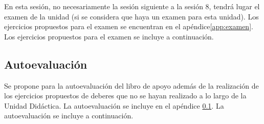 En esta sesión, no necesariamente la sesión siguiente a la sesión 8, tendrá lugar el examen de la unidad (si se considera que haya un examen para esta unidad).
%
\ifinapp
	Los ejercicios propuestos para el examen se encuentran en el apéndice\ref{app:examen}.
\else 
	Los ejercicios propuestos para el examen se incluye a continuación.
	
\fi


\subsection{Autoevaluación}
\label{app:autoeval}

Se propone para la autoevaluación del libro de apoyo \cite[p. 120]{MareaVerde} además de la realización de los ejercicios propuestos de deberes que no se hayan realizado a lo largo de la Unidad Didáctica.
%
\ifinapp
	La autoevaluación se incluye en el apéndice \ref{app:autoeval}.
\else 
	La autoevaluación se incluye a continuación.
	
\fi


